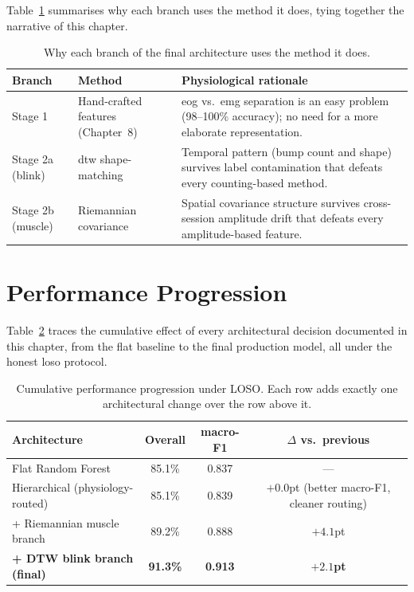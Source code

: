 Table~\ref{tab:why_each_method} summarises why each branch uses the
method it does, tying together the narrative of this chapter.

\begin{table}[htbp]
\centering
\caption{Why each branch of the final architecture uses the method
it does.}
\label{tab:why_each_method}
\renewcommand{\arraystretch}{1.4}
\begin{tabular}{p{2.3cm} p{3.4cm} p{6.0cm}}
\toprule
\textbf{Branch} & \textbf{Method} &
\textbf{Physiological rationale} \\
\midrule
Stage 1 & Hand-crafted features (Chapter~8) & \acrshort{eog} vs.\
    \acrshort{emg} separation is an easy problem (98--100\%
    accuracy); no need for a more elaborate representation. \\
Stage 2a (blink) & \acrshort{dtw} shape-matching & Temporal
    pattern (bump count and shape) survives label contamination
    that defeats every counting-based method. \\
Stage 2b (muscle) & Riemannian covariance & Spatial covariance
    structure survives cross-session amplitude drift that defeats
    every amplitude-based feature. \\
\bottomrule
\end{tabular}
\end{table}

\section{Performance Progression}
\label{sec:cl_progression}

Table~\ref{tab:progression} traces the cumulative effect of every
architectural decision documented in this chapter, from the flat
baseline to the final production model, all under the honest
\acrshort{loso} protocol.

\begin{table}[htbp]
\centering
\caption{Cumulative performance progression under LOSO. Each row
adds exactly one architectural change over the row above it.}
\label{tab:progression}
\renewcommand{\arraystretch}{1.3}
\begin{tabular}{l c c c}
\toprule
\textbf{Architecture} & \textbf{Overall} & \textbf{macro-F1} &
\textbf{$\Delta$ vs.\ previous} \\
\midrule
Flat Random Forest & 85.1\% & 0.837 & --- \\
Hierarchical (physiology-routed) & 85.1\% & 0.839 &
    $+0.0$pt (better macro-F1, cleaner routing) \\
+ Riemannian muscle branch & 89.2\% & 0.888 & $+4.1$pt \\
\textbf{+ DTW blink branch (final)} & \textbf{91.3\%} &
    \textbf{0.913} & \textbf{$+2.1$pt} \\
\bottomrule
\end{tabular}
\end{table}

